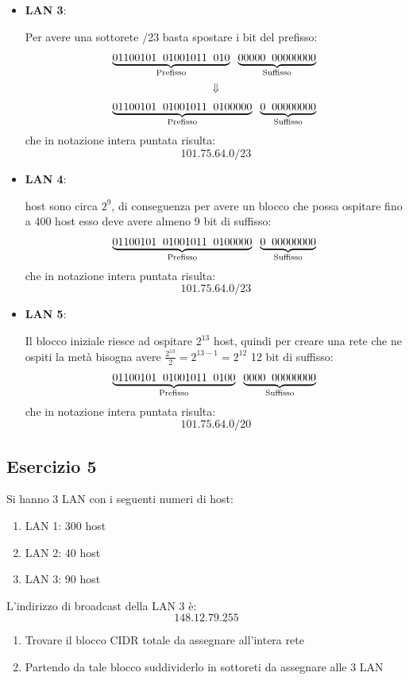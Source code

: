\documentclass[a4paper]{article}
\begin{document}
\begin{enumerate}
\begin{itemize}
  \item \textbf{LAN 3}:

    \vspace{1em}
    \noindent
    Per avere una sottorete /23 basta spostare i bit del prefisso:
    \[
      \underbrace{01100101 \;\; 01001011 \;\; 010}_{\text{Prefisso}}
      \;\; \underbrace{00000 \;\; 00000000}_{\text{Suffisso}}\\
    \]
    \[
      \Downarrow
    \]
    \[
      \underbrace{01100101 \;\; 01001011 \;\; 0100000}_{\text{Prefisso}}
      \;\; \underbrace{0 \;\; 00000000}_{\text{Suffisso}}\\
    \] 
    che in notazione intera puntata risulta:
    \[
      101.75.64.0/23
    \] 


  \item \textbf{LAN 4}:

    \vspace{1em}
     host sono circa \( 2^{9} \), di conseguenza per avere un blocco che possa
    ospitare fino a 400 host esso deve avere almeno 9 bit di suffisso:
    \[
      \underbrace{01100101 \;\; 01001011 \;\; 0100000}_{\text{Prefisso}}
      \;\; \underbrace{0 \;\; 00000000}_{\text{Suffisso}}\\
    \] 
    che in notazione intera puntata risulta:
    \[
      101.75.64.0/23
    \] 

  \item \textbf{LAN 5}:

    \vspace{1em}
    \noindent
    Il blocco iniziale riesce ad ospitare \( 2^{13} \) host, quindi per creare una rete
    che ne ospiti la metà bisogna avere \( \frac{2^{13}}{2} = 2^{13-1} = 2^{12} \) 12
    bit di suffisso:
    \[
      \underbrace{01100101 \;\; 01001011 \;\; 0100}_{\text{Prefisso}}
      \;\; \underbrace{0000 \;\; 00000000}_{\text{Suffisso}}\\
    \] 
    che in notazione intera puntata risulta:
    \[
      101.75.64.0/20
    \] 
\end{itemize}
\end{enumerate}

\subsection{Esercizio 5}
Si hanno 3 LAN con i seguenti numeri di host:
\begin{enumerate}
  \item LAN 1: 300 host
  \item LAN 2: 40 host
  \item LAN 3: 90 host
\end{enumerate}
L'indirizzo di broadcast della LAN 3 è:
\[
148.12.79.255
\] 
\begin{enumerate}
  \item Trovare il blocco CIDR totale da assegnare all'intera rete
  \item Partendo da tale blocco suddividerlo in sottoreti da assegnare alle 3 LAN
\end{enumerate}
\end{document}
